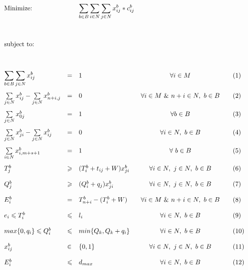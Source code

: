 \documentclass{article}
\begin{document}
\begin{equation*}
\def\arraystretch{2}
\begin{array}{lllcll} %
\text{Minimize:}  && \displaystyle\sum\limits_{b \in B}\sum\limits_{i \in N}\sum\limits_{j \in N}x_{ij}^{b}*c_{ij}^{b} && & \\
	&	&	&	&	&  \\
\text{subject to:}&   &  &  & &\\
	&	&	& 	&	& \\
	 \displaystyle\sum\limits_{b \in B}\sum\limits_{j \in N}x_{ij}^{b} &=& 1 &  \forall i \in M & & (1) \\ %
	 \sum\limits_{j \in N}x_{ij}^{b} - \sum\limits_{j \in N}x_{n+i, j}^{b} &=& 0	& \forall i \in M \ \& \   n+i \in N, \ b \in B	&&  (2) \\
	 \sum\limits_{j \in N}x_{0j}^{b}&=&1	&\forall b \in B & & (3) \\
	 \sum\limits_{j \in N}x_{ji}^{b} - \sum\limits_{j \in N}x_{ij}^{b} &=& 0	& \forall i \in N, \ b \in B	&&  (4) \\
	 \sum\limits_{i \in N}x_{i,m+s+1}^{b} &=& 1	&	\forall \ b \in B& & (5) \\
	 T^{b}_{j} &\geqslant& ( T^{b}_{i}+t_{ij}+W)x_{ji}^{b} 	& \forall i \in N,\  j \in N, \ b \in B		&&  (6) \\
	 Q^{b}_{j}& \geqslant& ( Q^{b}_{i}+q_j)x_{ji}^{b} 		&\forall i \in N,\  j \in N, \ b \in B		&&  (7) \\
	 E^{b}_{i}	&=&T^{b}_{n+i} -( T^{b}_{i}+W)	&\forall i \in M \ \& \   n+i \in N, \ b \in B		& & (8) \\
	 e_i \leqslant T^{b}_{i}	&\leqslant	&  l_i	&\forall i \in N, \ b \in B	&& (9) \\
	 max\{0,q_i\} \leqslant Q^{b}_{i}&	\leqslant&min\{Q_k, Q_k + q_i\} 	&\forall i \in N, \ b \in B	&& (10) \\
	 x_{ij}^{b} &\in& \{0,1\}	&\forall i \in N,\  j \in N, \ b \in B	& & (11) \\
	 E^{b}_{i} &\leqslant	&  {d}_{max}	&\forall i \in N,\ b \in B	& & (12) \\
\end{array}
\end{equation*}
\end{document}
